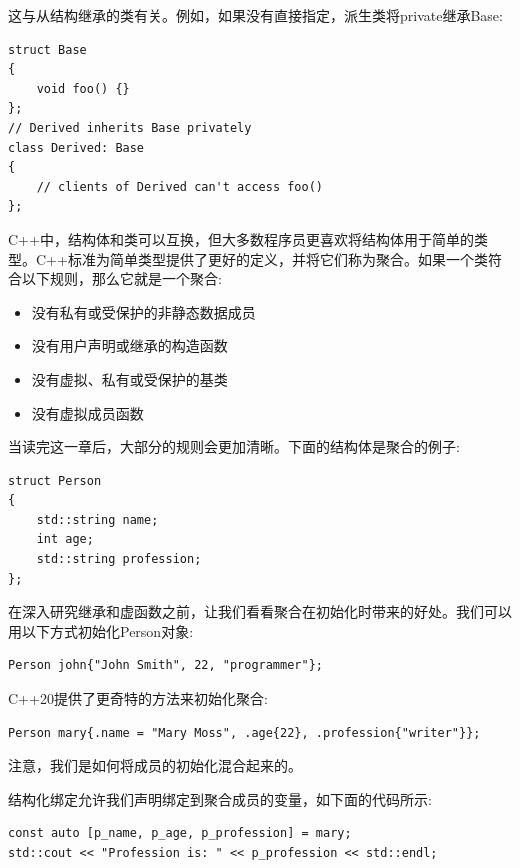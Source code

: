 这与从结构继承的类有关。例如，如果没有直接指定，派生类将private继承Base:\par

\begin{lstlisting}[caption={}]
struct Base
{
	void foo() {}
};
// Derived inherits Base privately
class Derived: Base
{
	// clients of Derived can't access foo()
};
\end{lstlisting}

C++中，结构体和类可以互换，但大多数程序员更喜欢将结构体用于简单的类型。C++标准为简单类型提供了更好的定义，并将它们称为聚合。如果一个类符合以下规则，那么它就是一个聚合: \par

\begin{itemize}
	\item 没有私有或受保护的非静态数据成员
	\item 没有用户声明或继承的构造函数
	\item 没有虚拟、私有或受保护的基类
	\item 没有虚拟成员函数
\end{itemize}

当读完这一章后，大部分的规则会更加清晰。下面的结构体是聚合的例子: \par

\begin{lstlisting}[caption={}]
struct Person
{
	std::string name;
	int age;
	std::string profession;
};
\end{lstlisting}

在深入研究继承和虚函数之前，让我们看看聚合在初始化时带来的好处。我们可以用以下方式初始化Person对象: \par

\begin{lstlisting}[caption={}]
Person john{"John Smith", 22, "programmer"};
\end{lstlisting}

C++20提供了更奇特的方法来初始化聚合: \par

\begin{lstlisting}[caption={}]
Person mary{.name = "Mary Moss", .age{22}, .profession{"writer"}};
\end{lstlisting}

注意，我们是如何将成员的初始化混合起来的。 \par
结构化绑定允许我们声明绑定到聚合成员的变量，如下面的代码所示: \par

\begin{lstlisting}[caption={}]
const auto [p_name, p_age, p_profession] = mary;
std::cout << "Profession is: " << p_profession << std::endl;
\end{lstlisting}

